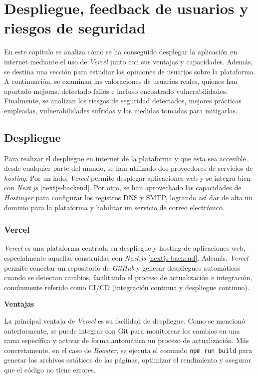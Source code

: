\chapter{Despliegue, feedback de usuarios y riesgos de seguridad}

En este capítulo se analiza cómo se ha conseguido desplegar la aplicación en internet mediante el uso de \textit{Vercel} junto con sus ventajas y capacidades. Además, se destina una sección para estudiar las opiniones de usuarios sobre la plataforma. A continuación, se examinan las valoraciones de usuarios reales, quienes han aportado mejoras, detectado fallos e incluso encontrado vulnerabilidades.
Finalmente, se analizan los riesgos de seguridad detectados, mejores prácticas empleadas, vulnerabilidades sufridas y las medidas tomadas para mitigarlas.


\section{Despliegue}

Para realizar el despliegue en internet de la plataforma y que esta sea accesible desde cualquier parte del mundo, se han utilizado dos proveedores de servicios de \textit{hosting}. Por un lado, \textit{Vercel} permite desplegar aplicaciones web y se integra bien con \textit{Next.js} \ref{nextjs-backend}. Por otro, se han aprovechado las capacidades de \textit{Hostinger} para configurar los registros DNS y SMTP, logrando así dar de alta un dominio para la plataforma y habilitar un servicio de correo electrónico.  
\subsection{Vercel}

\textit{Vercel} es una plataforma centrada en despliegue y hosting de aplicaciones web, especialmente aquellas construidas con \textit{Next.js} \ref{nextjs-backend}. Además, \textit{Vercel} permite conectar un repositorio de \textit{GitHub} y generar despliegues automáticos cuando se detectan cambios, facilitando el proceso de actualización e integración, comúnmente referido como CI/CD (integración continua y despliegue continuo).  

\textbf{Ventajas}

La principal ventaja de \textit{Vercel} es su facilidad de despliegue. Como se mencionó anteriormente, se puede integrar con Git para monitorear los cambios en una rama específica y activar de forma automática un proceso de actualización. Más concretamente, en el caso de \textit{Booster}, se ejecuta el comando \texttt{npm run build} para generar los archivos estáticos de las páginas, optimizar el rendimiento y asegurar que el código no tiene errores. 

